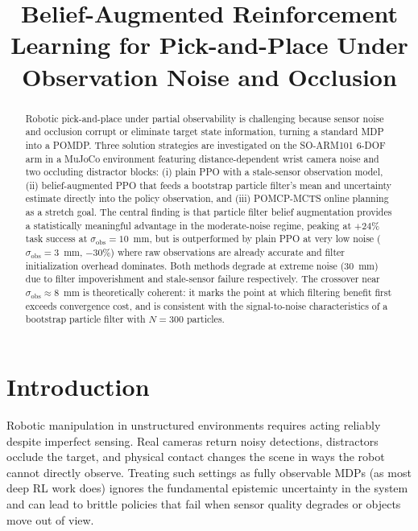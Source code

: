 \documentclass[conference]{IEEEtran}
\title{Belief-Augmented Reinforcement Learning for Pick-and-Place
       Under Observation Noise and Occlusion}
\author{
  \IEEEauthorblockN{Allen Devaraj Augustin Ponraj}
  \IEEEauthorblockA{
    Department of Aerospace Engineering Sciences\\
    University of Colorado Boulder\\
    allendevaraj.augustinponraj@colorado.edu
  }
}
\newcommand{\sigmaobs}{\sigma_{\text{obs}}}
\begin{document}
\maketitle

\begin{abstract}
Robotic pick-and-place under partial observability is challenging because
sensor noise and occlusion corrupt or eliminate target state information,
turning a standard MDP into a POMDP.
Three solution strategies are investigated on the SO-ARM101 6-DOF arm in
a MuJoCo environment featuring distance-dependent wrist camera noise and
two occluding distractor blocks:
(i) plain PPO with a stale-sensor observation model,
(ii) belief-augmented PPO that feeds a bootstrap particle filter's mean
and uncertainty estimate directly into the policy observation,
and (iii) POMCP-MCTS online planning as a stretch goal.
The central finding is that particle filter belief augmentation provides
a statistically meaningful advantage in the moderate-noise regime,
peaking at $+24\%$ task success at $\sigmaobs = 10$~mm,
but is outperformed by plain PPO at very low noise ($\sigmaobs = 3$~mm, $-30\%$)
where raw observations are already accurate and filter initialization overhead
dominates.
Both methods degrade at extreme noise ($30$~mm) due to filter impoverishment
and stale-sensor failure respectively.
The crossover near $\sigmaobs \approx 8$~mm is theoretically coherent:
it marks the point at which filtering benefit first exceeds convergence cost,
and is consistent with the signal-to-noise characteristics of a bootstrap
particle filter with $N\!=\!300$ particles.
\end{abstract}

\section{Introduction}
\label{sec:intro}

Robotic manipulation in unstructured environments requires acting reliably
despite imperfect sensing.
Real cameras return noisy detections, distractors occlude the target, and
physical contact changes the scene in ways the robot cannot directly observe.
Treating such settings as fully observable MDPs (as most deep RL work does)
ignores the fundamental epistemic uncertainty in the system and can lead to
brittle policies that fail when sensor quality degrades or objects move
out of view.
\end{document}
